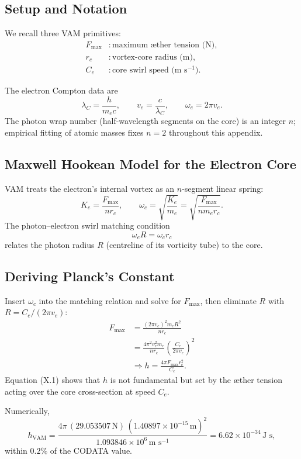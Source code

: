 \documentclass[a4paper,12pt]{article}
\begin{document}
\subsection{Setup and Notation}

We recall three VAM primitives:
\begin{align*}
F_{\max} & : \text{maximum \ae ther tension (N)}, \\
r_c & : \text{vortex-core radius (m)}, \\
C_e&:\text{core swirl speed (m s$^{-1}$)}.
\end{align*}

The electron Compton data are
\[
\lambda_C = \frac{h}{m_e c}, \qquad v_e = \frac{c}{\lambda_C}, \qquad \omega_e = 2\pi v_e.
\]
The photon wrap number (half-wavelength segments on the core) is an integer $n$; empirical fitting of atomic masses fixes $n=2$ throughout this appendix.

\subsection{Maxwell Hookean Model for the Electron Core}

VAM treats the electron's internal vortex as an $n$-segment linear spring:
\[
K_e = \frac{F_{\max}}{n r_c}, \qquad \omega_c = \sqrt{\frac{K_e}{m_e}} = \sqrt{\frac{F_{\max}}{n m_e r_c}}.
\]
The photon--electron swirl matching condition
\[
\omega_e R = \omega_c r_c
\]
relates the photon radius $R$ (centreline of its vorticity tube) to the core.

\subsection{Deriving Planck's Constant}

Insert $\omega_c$ into the matching relation and solve for $F_{\max}$, then eliminate $R$ with $R=C_e/(2\pi v_e)$:
\begin{align*}
F_{\max}
&= \frac{(2\pi v_e)^2 m_e R^2}{n r_c} \\
&= \frac{4\pi^2 v_e^2 m_e}{n r_c} \left( \frac{C_e}{2\pi v_e} \right)^2 \\[4pt]
&\Longrightarrow \boxed{h = \frac{4\pi F_{\max} r_c^2}{C_e}}. \tag{X.1}
\end{align*}
Equation (X.1) shows that $h$ is not fundamental but set by the \ae ther tension acting over the core cross-section at speed $C_e$.

Numerically,
\[
h_{\text{VAM}} = \frac{4\pi\,(29.053507\,\text{N})\,(1.40897\times10^{-15}\,\text{m})^2}{1.093846\times10^{6}\,\text{m s}^{-1}} = 6.62\times10^{-34}\,\text{J s},
\]
within $0.2\%$ of the CODATA value.
\end{document}
